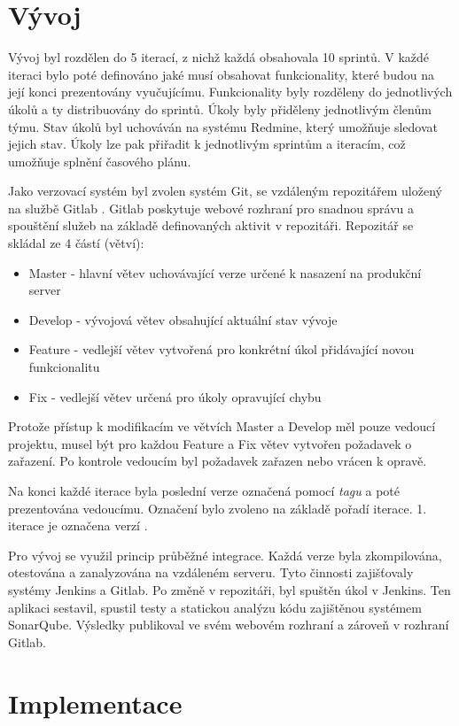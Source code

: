 \documentclass[thesis=B,czech]{FITthesis}[2012/06/26]
\begin{document}
\section{Vývoj}
Vývoj byl rozdělen do 5 iterací, z nichž každá obsahovala 10 sprintů. V každé iteraci bylo poté definováno jaké musí obsahovat funkcionality,
které budou na její konci prezentovány vyučujícímu. Funkcionality byly rozděleny do jednotlivých úkolů a ty distribuovány do sprintů.
Úkoly byly přiděleny jednotlivým členům týmu. Stav úkolů byl uchováván na systému Redmine\cite{Redmine}, který umožňuje sledovat jejich stav.
Úkoly lze pak přiřadit k jednotlivým sprintům a iteracím, což umožňuje splnění časového plánu.
\par
Jako verzovací systém byl zvolen systém Git, se vzdáleným repozitářem uložený na službě Gitlab \cite{gitlab}. Gitlab poskytuje webové rozhraní pro snadnou správu a spouštění služeb na základě definovaných aktivit v repozitáři. Repozitář se skládal ze 4 částí (větví):
\begin{itemize}
\item Master - hlavní větev uchovávající verze určené k nasazení na produkční server
\item Develop - vývojová větev obsahující aktuální stav vývoje
\item Feature - vedlejší větev vytvořená pro konkrétní úkol přidávající novou funkcionalitu
\item Fix - vedlejší větev určená pro úkoly opravující chybu
\end{itemize}
Protože přístup k modifikacím ve větvích Master a Develop měl pouze vedoucí projektu, musel být pro každou Feature a Fix větev
vytvořen požadavek o zařazení. Po kontrole vedoucím byl požadavek zařazen nebo vrácen k opravě.
\par
Na konci každé iterace byla poslední verze označená pomocí \textit{tagu} a poté prezentována vedoucímu.
Označení bylo zvoleno na základě pořadí iterace. 1. iterace je označena verzí .
\par
Pro vývoj se využil princip průběžné integrace. Každá verze byla zkompilována, otestována a zanalyzována na vzdáleném serveru.
Tyto činnosti zajišťovaly systémy Jenkins\cite{jenkins} a Gitlab. Po změně v repozitáři, byl spuštěn úkol v Jenkins. Ten aplikaci sestavil, spustil testy a statickou analýzu kódu 
zajištěnou systémem SonarQube\cite{sonar}. Výsledky publikoval ve svém webovém rozhraní a zároveň v rozhraní Gitlab.  
\section{Implementace}
\end{document}
